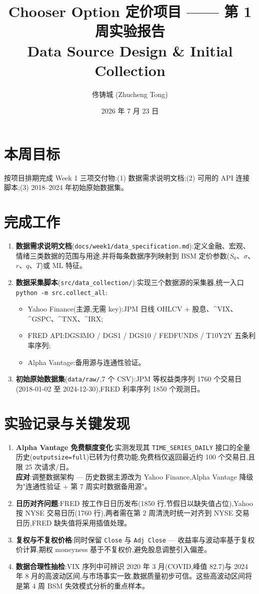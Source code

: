 \documentclass[11pt]{ctexart}
\title{\textbf{Chooser Option 定价项目 —— 第 1 周实验报告}\\
\large Data Source Design \& Initial Collection}
\author{佟铸城 (Zhucheng Tong)}
\date{2026 年 7 月 23 日}
\begin{document}
\maketitle

\section{本周目标}
按项目排期完成 Week 1 三项交付物:(1) 数据需求说明文档;(2) 可用的 API 连接脚本;(3) 2018--2024 年初始原始数据集。

\section{完成工作}
\begin{enumerate}
  \item \textbf{数据需求说明文档}(\texttt{docs/week1/data\_specification.md}):定义金融、宏观、情绪三类数据的范围与用途,并将每条数据序列映射到 BSM 定价参数($S_0$、$\sigma$、$r$、$q$、$T$)或 ML 特征。
  \item \textbf{数据采集脚本}(\texttt{src/data\_collection/}):实现三个数据源的采集器,统一入口 \texttt{python -m src.collect\_all}:
    \begin{itemize}
      \item Yahoo Finance(主源,无需 key):JPM 日线 OHLCV + 股息、\^{}VIX、\^{}GSPC、\^{}TNX、\^{}IRX;
      \item FRED API:DGS3MO / DGS1 / DGS10 / FEDFUNDS / T10Y2Y 五条利率序列;
      \item Alpha Vantage:备用源与连通性验证。
    \end{itemize}
  \item \textbf{初始原始数据集}(\texttt{data/raw/},7 个 CSV):JPM 等权益类序列 1760 个交易日(2018-01-02 至 2024-12-30),FRED 利率序列 1850 个观测日。
\end{enumerate}

\section{实验记录与关键发现}
\begin{enumerate}
  \item \textbf{Alpha Vantage 免费额度变化}:实测发现其 \texttt{TIME\_SERIES\_DAILY} 接口的全量历史(\texttt{outputsize=full})已转为付费功能,免费档仅返回最近约 100 个交易日,且限 25 次请求/日。\\
  \textbf{应对}:调整数据架构 --- 历史数据主源改为 Yahoo Finance,Alpha Vantage 降级为"连通性验证 + 第 7 周实时数据备用源"。
  \item \textbf{日历对齐问题}:FRED 按工作日日历发布(1850 行,节假日以缺失值占位),Yahoo 按 NYSE 交易日历(1760 行),两者需在第 2 周清洗时统一对齐到 NYSE 交易日历,FRED 缺失值将采用插值处理。
  \item \textbf{复权与不复权价格}:同时保留 \texttt{Close} 与 \texttt{Adj Close} --- 收益率与波动率基于复权价计算,期权 moneyness 基于不复权价,避免股息调整引入偏差。
  \item \textbf{数据合理性抽检}:VIX 序列中可辨识 2020 年 3 月(COVID,峰值 82.7)与 2024 年 8 月的高波动区间,与市场事实一致,数据质量初步可信。这些高波动区间将是第 4 周 BSM 失效模式分析的重点样本。
\end{enumerate}
\end{document}
